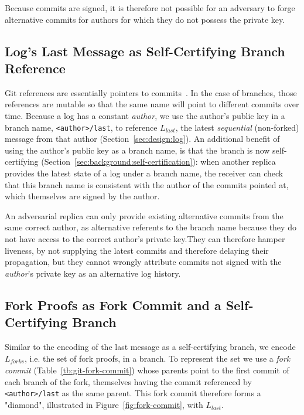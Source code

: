 \documentclass[9pt, oneside]{article}   	%
\begin{document}
Because commits are signed, it is therefore not possible for an adversary to forge alternative commits for authors for which they do not possess the private key.


\subsection{Log's Last Message as Self-Certifying Branch Reference}

Git references are essentially pointers to commits~\cite{git-reference}. In the case of branches, those references are mutable so that the same name will point to different commits over time. Because a log has a constant \textit{author}, we use the author's public key in a branch name,  \texttt{<author>/last}, to reference $L_\textit{last}$, the latest \textit{sequential} (non-forked) message  from that author (Section~\ref{sec:design:log}). An additional benefit of using the author's public key as a branch name, is that the branch is now self-certifying (Section~\ref{sec:background:self-certification}): when another replica provides the latest state of a log under a branch name, the receiver can check that this branch name is consistent with the author of the commits pointed at, which themselves are signed by the author. 

An adversarial replica can only provide existing alternative commits from the same correct author, as alternative referents to the branch name because they do not have access to the correct author's private key.They can therefore hamper liveness, by not supplying the latest commits and therefore delaying their propagation, but they cannot wrongly attribute commits not signed with the \textit{author}'s private key as an alternative log history.

\subsection{Fork Proofs as Fork Commit and a Self-Certifying Branch}

Similar to the encoding of the last message as a self-certifying branch, we encode $L_\textit{forks}$, i.e. the set of fork proofs, in a branch. To represent the set we use a \textit{fork commit} (Table~\ref{tb:git-fork-commit}) whose parents point to the first commit of each branch of the fork, themselves having the commit referenced by  \texttt{<author>/last} as the same parent. This fork commit therefore forms a "diamond", illustrated in Figure~\ref{fig:fork-commit}, with $L_\textit{last}$.
\end{document}
